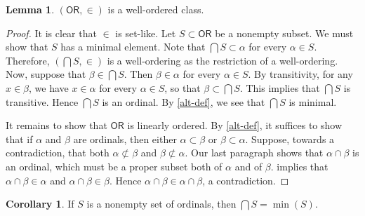 \documentclass[10pt,letterpaper,cm]{nupset}
\theoremstyle{definition}
\theoremstyle{theorem}
\newtheorem{lemma}[definition]{Lemma}
\newtheorem{corollary}[definition]{Corollary}
\theoremstyle{remark}
\newcommand{\1}{\mathbf{1}}
\newcommand{\0}{\vec 0}
\newcommand{\ord}{\mathsf{OR}}
\begin{document}
\begin{lemma} \label{ord-wo}
$\left(\ord, \in\right)$ is a well-ordered class.
\end{lemma}
\begin{proof}
It is clear that $\in$ is set-like. Let $S \subset \ord$ be a nonempty subset. We must show that $S$ has a minimal element. Note that $\bigcap{S} \subset \alpha$ for every $\alpha \in S$. Therefore, $\left(\bigcap{S}, \in\right)$ is a  well-ordering as the restriction of a well-ordering. Now, suppose that $\beta \in \bigcap{S}$. Then $\beta \in \alpha$ for every $\alpha \in S$. By transitivity, for any $x\in \beta$, we have  $x \in \alpha$ for every $\alpha \in S$, so that $\beta \subset \bigcap{S}$. This implies that $\bigcap{S}$ is transitive. Hence $\bigcap{S}$ is an ordinal. By \cref{alt-def}, we see that $\bigcap{S}$ is minimal. 

\smallskip

It remains to show that $\ord$ is linearly ordered. By \cref{alt-def}, it suffices to show that if $\alpha$ and $\beta$ are ordinals, then either $\alpha \subset \beta$ or $\beta \subset \alpha$. Suppose, towards a contradiction, that  both $\alpha \not \subset \beta$ and $\beta \not \subset \alpha$. Our last paragraph shows that $\alpha \cap \beta$ is an ordinal, which must be a proper subset both of $\alpha$ and of $\beta$.  implies that $\alpha \cap \beta \in \alpha$ and $\alpha \cap \beta \in \beta$. Hence $\alpha \cap \beta \in \alpha \cap \beta$, a contradiction. 
\end{proof}

\begin{corollary}
If $S$ is a nonempty set of ordinals, then  $\bigcap{S} = \min(S)$.
\end{corollary}
\end{document}
